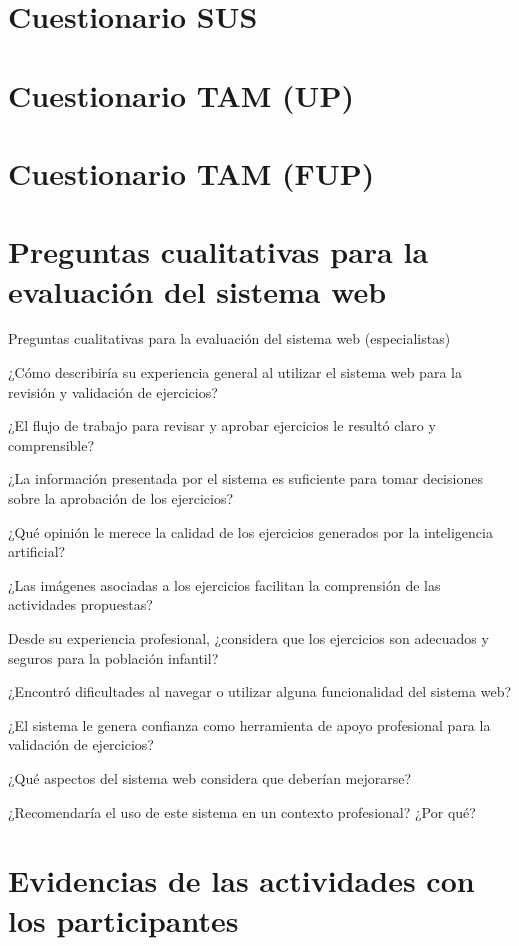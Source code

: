 	\section{Cuestionario SUS}
	
	\section{Cuestionario TAM (UP)}
	
	\section{Cuestionario TAM (FUP)}
	
	\section{Preguntas cualitativas para la evaluación del sistema web}
		Preguntas cualitativas para la evaluación del sistema web (especialistas)
		
		¿Cómo describiría su experiencia general al utilizar el sistema web para la revisión y validación de ejercicios?
		
		¿El flujo de trabajo para revisar y aprobar ejercicios le resultó claro y comprensible?
		
		¿La información presentada por el sistema es suficiente para tomar decisiones sobre la aprobación de los ejercicios?
		
		¿Qué opinión le merece la calidad de los ejercicios generados por la inteligencia artificial?
		
		¿Las imágenes asociadas a los ejercicios facilitan la comprensión de las actividades propuestas?
		
		Desde su experiencia profesional, ¿considera que los ejercicios son adecuados y seguros para la población infantil?
		
		¿Encontró dificultades al navegar o utilizar alguna funcionalidad del sistema web?
		
		¿El sistema le genera confianza como herramienta de apoyo profesional para la validación de ejercicios?
		
		¿Qué aspectos del sistema web considera que deberían mejorarse?
		
		¿Recomendaría el uso de este sistema en un contexto profesional? ¿Por qué?

	\section{Evidencias de las actividades con los participantes}
